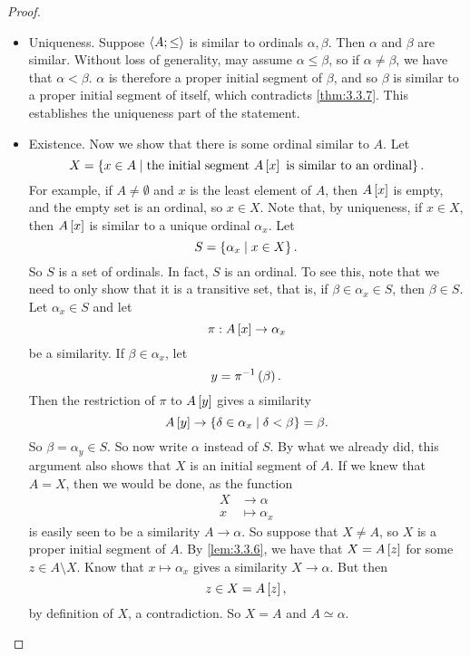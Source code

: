 \begin{proof}
\hfill
\begin{itemize}
\item Uniqueness. Suppose $ \ab{A; \le} $ is similar to ordinals $ \alpha, \beta $. Then $ \alpha $ and $ \beta $ are similar. Without loss of generality, may assume $ \alpha \le \beta $, so if $ \alpha \ne \beta $, we have that $ \alpha < \beta $. $ \alpha $ is therefore a proper initial segment of $ \beta $, and so $ \beta $ is similar to a proper initial segment of itself, which contradicts \ref{thm:3.3.7}. This establishes the uniqueness part of the statement.
\item Existence. Now we show that there is some ordinal similar to $ A $. Let
$$ X = \cb{x \in A \mid \text{the initial segment} \ A\sb{x} \ \text{is similar to an ordinal}}. $$
For example, if $ A \ne \emptyset $ and $ x $ is the least element of $ A $, then $ A\sb{x} $ is empty, and the empty set is an ordinal, so $ x \in X $. Note that, by uniqueness, if $ x \in X $, then $ A\sb{x} $ is similar to a unique ordinal $ \alpha_x $. Let
$$ S = \cb{\alpha_x \mid x \in X}. $$
So $ S $ is a set of ordinals. In fact, $ S $ is an ordinal. To see this, note that we need to only show that it is a transitive set, that is, if $ \beta \in \alpha_x \in S $, then $ \beta \in S $. Let $ \alpha_x \in S $ and let
$$ \pi : A\sb{x} \to \alpha_x $$
be a similarity. If $ \beta \in \alpha_x $, let
$$ y = \pi^{-1}\rb{\beta}. $$
Then the restriction of $ \pi $ to $ A\sb{y} $ gives a similarity
$$ A\sb{y} \to \cb{\delta \in \alpha_x \mid \delta < \beta} = \beta. $$
So $ \beta = \alpha_y \in S $. So now write $ \alpha $ instead of $ S $. By what we already did, this argument also shows that $ X $ is an initial segment of $ A $. If we knew that $ A = X $, then we would be done, as the function
\begin{align*}
X & \to \alpha \\
x & \mapsto \alpha_x
\end{align*}
is easily seen to be a similarity $ A \to \alpha $. So suppose that $ X \ne A $, so $ X $ is a proper initial segment of $ A $. By \ref{lem:3.3.6}, we have that $ X = A\sb{z} $ for some $ z \in A \setminus X $. Know that $ x \mapsto \alpha_x $ gives a similarity $ X \to \alpha $. But then
$$ z \in X = A\sb{z}, $$
by definition of $ X $, a contradiction. So $ X = A $ and $ A \simeq \alpha $.
\end{itemize}
\end{proof}


